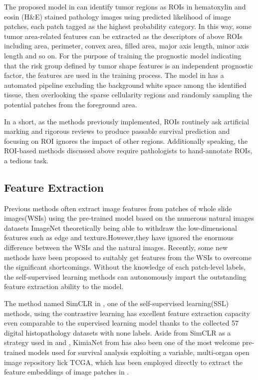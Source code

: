 \documentclass[journal,twoside,web]{ieeecolor}
\begin{document}
The proposed model in \cite{wang2018comprehensive} can identify tumor regions as ROIs in hematoxylin and eosin (H\&E) stained pathology images using predicted likelihood of image patches, each patch tagged as the highest probability category. 
In this way, some tumor area-related features can be extracted as the descriptors of above ROIs including area, perimeter, convex area, filled area, major axis length, minor axis length and so on.
For the purpose of training the prognostic model indicating that the risk group defined by tumor shape features is an independent prognostic factor, the features are used in the training process.
The model in \cite{mackenzie2022neural} has a automated pipeline excluding the background white space among the identified tissue, then overlooking the sparse cellularity regions and randomly sampling the potential patches from the foreground area.

In a short, as the methods previously implemented, ROIs routinely ask artificial marking and rigorous reviews to produce passable survival prediction and focusing on ROI ignores the impact of other regions.
Additionally speaking, the ROI-based methods discussed above require pathologists to hand-annotate ROIs, a tedious task.

\subsection{Feature Extraction}
Previous methods often extract image features from patches of whole slide images(WSIs) using the pre-trained model based on the numerous natural images datasets ImageNet theoretically being able to withdraw the low-dimensional features such as edge and texture.However,they have ignored the enormous difference between the WSIs and the natural images.
Recently, some new methods have been proposed to suitably get features from the WSIs to overcome the significant shortcomings.
Without the knowledge of each patch-level labels, the self-supervised learning methods can autonomously impart the outstanding feature extraction ability to the model.

The method named SimCLR in \cite{ciga2022self}, one of the self-supervised learning(SSL) methods, using the contrastive learning has excellent feature extraction capacity even comparable to the supervised learning model thanks to the collected 57 digital histopathology datasets with none labels.
Aside from SimCLR as a strategy used in \cite{benkirane2022hyper} and \cite{li2021dual}, KimiaNet from \cite{riasatian2021fine} has also been one of the most welcome pre-trained models used for survival analysis exploiting a variable, multi-organ open image repository lick TCGA, which has been employed directly to extract the feature embeddings of image patches in \cite{guo2023higt} \cite{li2021dual}.
\end{document}
